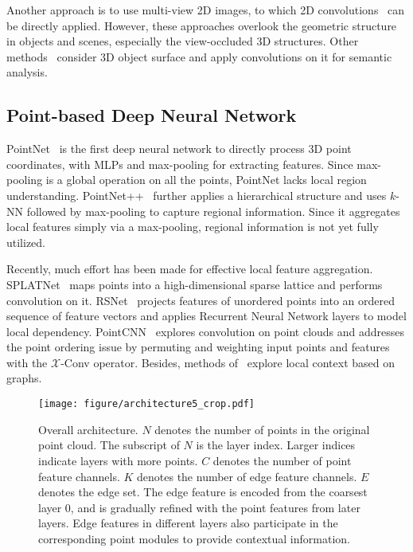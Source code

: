 \documentclass[10pt,twocolumn,letterpaper]{article}
\begin{document}
Another approach is to use multi-view 2D images, to which 2D convolutions~\cite{mvcnn, volumetric_multiview} can be directly applied. However, these approaches overlook the geometric structure in objects and scenes, especially the view-occluded 3D structures. 
Other methods~\cite{tangent_conv, pan2018convolutional} consider 3D object surface and apply convolutions on it for semantic analysis. 

\subsection{Point-based Deep Neural Network}

PointNet~\cite{pointnet} is the first deep neural network to directly process 3D point coordinates, with MLPs and max-pooling for extracting features. Since max-pooling is a global operation on all the points, PointNet lacks local region understanding. 
PointNet++~\cite{pointnet2} further applies a hierarchical structure and uses $k$-NN followed by max-pooling to capture regional information.
Since it aggregates local features simply via a max-pooling, regional information is not yet fully utilized.

Recently, much effort has been made for effective local feature aggregation.
SPLATNet~\cite{splatnet} maps points into a high-dimensional sparse lattice and performs convolution on it. RSNet~\cite{huang2018recurrent} projects features of unordered points into an ordered sequence of feature vectors and applies Recurrent Neural Network
layers to model local dependency. PointCNN~\cite{pointcnn} explores convolution on point clouds and addresses the point ordering issue by permuting and weighting input points and features with the $\mathcal{X}$-Conv operator.
Besides, methods of~\cite{edgefilter, spectralconv, pointconv, dgcnn, continuousconv} explore local context based on graphs.

\begin{figure*}
	\begin{center}
		\texttt{[image: figure/architecture5\_crop.pdf]}
	\end{center}
	\vspace{-1mm}
	\caption{Overall architecture. $N$ denotes the number of points in the original point cloud. The subscript of $N$ is the layer index. Larger indices indicate layers with more points. $C$ denotes the number of point feature channels. $K$ denotes the number of edge feature channels. $E$ denotes the edge set. The edge feature is encoded from the coarsest layer 0, and is gradually refined with the point features from later layers. Edge features in different layers also participate in the corresponding point modules to provide contextual information. }
	\label{fig_framework}
	\vspace{-1mm}
\end{figure*}
\end{document}
